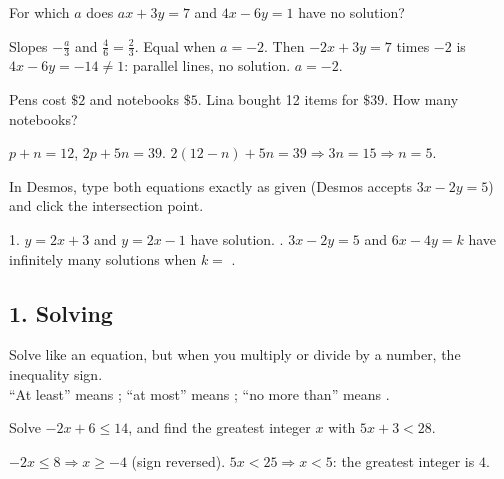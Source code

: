 For which $a$ does $ax+3y=7$ and $4x-6y=1$ have no solution?
\begin{workspace}[2.2cm]
Slopes $-\frac a3$ and $\frac46=\frac23$. Equal when $a=-2$. Then $-2x+3y=7$ times $-2$ is $4x-6y=-14\neq1$: parallel lines, no solution. $a=-2$.
\end{workspace}

Pens cost $\$2$ and notebooks $\$5$. Lina bought 12 items for $\$39$. How many notebooks?
\begin{workspace}[2cm]
$p+n=12$, $2p+5n=39$. $2(12-n)+5n=39 \Rightarrow 3n=15 \Rightarrow n=5$.
\end{workspace}

\begin{aptip}
In Desmos, type both equations exactly as given (Desmos accepts $3x-2y=5$) and click the intersection point.
\end{aptip}

\begin{quickcheck}
1. $y=2x+3$ and $y=2x-1$ have  solution. . $3x-2y=5$ and $6x-4y=k$ have infinitely many solutions when $k=$ .
\end{quickcheck}


\subsection*{1. Solving}
\begin{keyidea}
Solve like an equation, but when you multiply or divide by a  number,  the inequality sign.\\
``At least'' means \fillin{$\ge$}; ``at most'' means \fillin{$\le$}; ``no more than'' means \fillin{$\le$}.
\end{keyidea}

Solve $-2x+6\le14$, and find the greatest integer $x$ with $5x+3<28$.
\begin{workspace}[2.2cm]
$-2x\le8 \Rightarrow x\ge-4$ (sign reversed). \quad $5x<25 \Rightarrow x<5$: the greatest integer is $4$.
\end{workspace}


